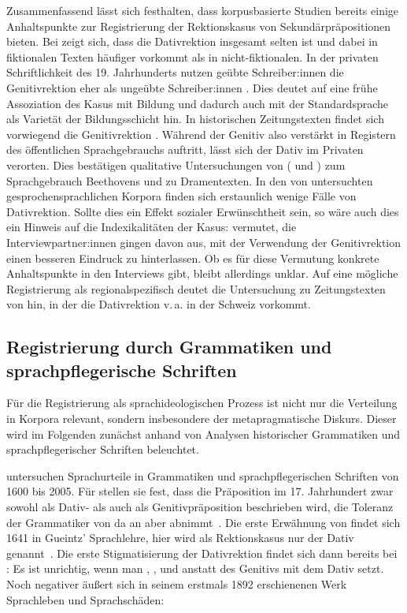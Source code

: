Zusammenfassend lässt sich festhalten, dass korpusbasierte Studien bereits einige Anhaltspunkte zur Registrierung der Rektionskasus von Sekundärpräpositionen bieten. 
Bei \citet[]{DiMeola2000} zeigt sich, dass die Dativrektion insgesamt selten ist und dabei in fiktionalen Texten häufiger vorkommt als in nicht-fiktionalen. 
In der privaten Schriftlichkeit des 19. Jahrhunderts nutzen geübte Schreiber:innen die Genitivrektion eher als ungeübte Schreiber:innen \citep[s.][]{Elspa.2005}. 
Dies deutet auf eine frühe Assoziation des Kasus mit Bildung und dadurch auch mit der Standardsprache als Varietät der Bildungsschicht hin. 
In historischen Zeitungstexten findet sich vorwiegend die Genitivrektion \citep[s.][]{Elspa.2015}. 
Während der Genitiv also verstärkt in Registern des öffentlichen Sprachgebrauchs auftritt, lässt sich der Dativ im Privaten verorten. 
Dies bestätigen qualitative Untersuchungen von \citeauthor{Sato.2015} (\citeyear{Sato.2015} und \citeyear{Sato.2016}) zum Sprachgebrauch Beethovens und zu Dramentexten. 
In den von \citet{Petig1997} untersuchten gesprochensprachlichen Korpora finden sich erstaunlich wenige Fälle von Dativrektion.
Sollte dies ein Effekt sozialer Erwünschtheit sein, so wäre auch dies ein Hinweis auf die Indexikalitäten der Kasus: 
\citet[37]{Petig1997} vermutet, die Interviewpartner:innen gingen davon aus, mit der Verwendung der Genitivrektion einen besseren Eindruck zu hinterlassen.
Ob es für diese Vermutung konkrete Anhaltspunkte in den Interviews gibt, bleibt allerdings unklar. 
Auf eine mögliche Registrierung als regionalspezifisch deutet die Untersuchung zu Zeitungstexten von \citet{Elter2005} hin, in der die Dativrektion v.\,a. in der Schweiz vorkommt. 
\subsection{Registrierung durch Grammatiken und sprachpflegerische Schriften} \label{sec:IndexikalitaetRektionskasushistorisch}
Für die Registrierung als sprachideologischen Prozess ist nicht nur die Verteilung in Korpora relevant, sondern insbesondere der metapragmatische Diskurs. 
Dieser wird im Folgenden zunächst anhand von Analysen historischer Grammatiken und sprachpflegerischer Schriften beleuchtet. 

\begin{sloppypar}
\citet{Davies2006} untersuchen Sprachurteile in Grammatiken und sprachpflegerischen Schriften von 1600 bis 2005.
Für \wegen{} stellen sie fest, dass die Präposition im 17. Jahrhundert zwar sowohl als Dativ- als auch als Genitivpr{\"a}position beschrieben wird, die Toleranz der Grammatiker von da an aber abnimmt~\citep[s.][202]{Davies2006}.
Die erste Erwähnung von \wegen{} findet sich 1641 in Gueintz' Sprachlehre, hier wird als Rektionskasus nur der Dativ genannt~\citep[s.][209]{Davies2006}. 
Die erste Stigmatisierung der Dativrektion findet sich dann bereits bei \citet[245]{Heynatz.1777}: 
\glqq Es ist unrichtig, wenn man , ,  und \wegen{} anstatt des Genitivs mit dem Dativ setzt.\grqq{}
Noch negativer äußert sich \citet[]{Matthias.1929} in seinem erstmals 1892 erschienenen Werk \glqq Sprachleben und Sprachschäden\grqq:
\end{sloppypar}

